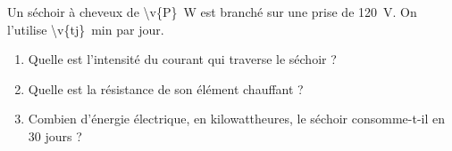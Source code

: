 Un séchoir à cheveux de \qty{\v{P}}{W} est branché sur une prise de \qty{120}{V}. On l'utilise \qty{\v{tj}}{min} par jour.

\begin{enumerate}[label=\alph*)]
    \item Quelle est l'intensité du courant qui traverse le séchoir ?
    \item Quelle est la résistance de son élément chauffant ?
    \item Combien d'énergie électrique, en kilowattheures, le séchoir consomme-t-il en 30 jours ?
\end{enumerate}
